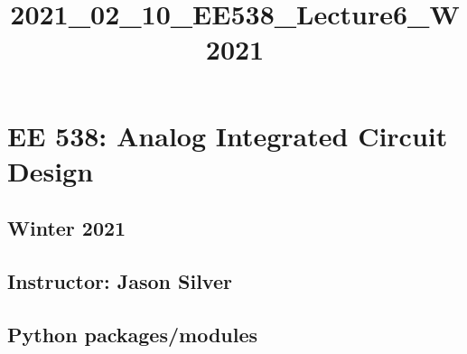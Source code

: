 \documentclass[11pt]{article}
\title{2021\_02\_10\_EE538\_Lecture6\_W2021}
\begin{document}
    
    \maketitle
    
    

    
    \hypertarget{ee-538-analog-integrated-circuit-design}{%
\section{EE 538: Analog Integrated Circuit
Design}\label{ee-538-analog-integrated-circuit-design}}

\hypertarget{winter-2021}{%
\subsection{Winter 2021}\label{winter-2021}}

\hypertarget{instructor-jason-silver}{%
\subsection{Instructor: Jason Silver}\label{instructor-jason-silver}}

    \hypertarget{python-packagesmodules}{%
\subsection{Python packages/modules}\label{python-packagesmodules}}
\end{document}
